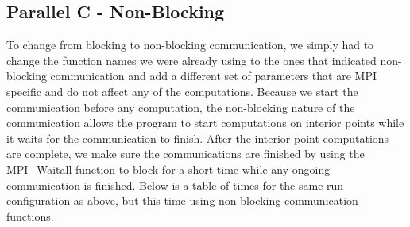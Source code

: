 \documentclass[11pt]{article}
\begin{document}
\subsection{Parallel C - Non-Blocking}
To change from blocking to non-blocking communication, we simply had to change the function names we were already using to the ones that indicated non-blocking communication and add a different set of parameters that are MPI specific and do not affect any of the computations. Because we start the communication before any computation, the non-blocking nature of the communication allows the program to start computations on interior points while it waits for the communication to finish. After the interior point computations are complete, we make sure the communications are finished by using the MPI\_Waitall function to block for a short time while any ongoing communication is finished. Below is a table of times for the same run configuration as above, but this time using non-blocking communication functions.
\end{document}
